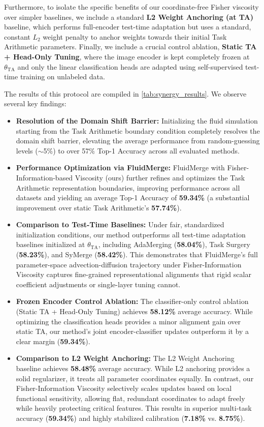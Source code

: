Furthermore, to isolate the specific benefits of our coordinate-free Fisher viscosity over simpler baselines, we include a standard \textbf{L2 Weight Anchoring (at TA)} baseline, which performs full-encoder test-time adaptation but uses a standard, constant $L_2$ weight penalty to anchor weights towards their initial Task Arithmetic parameters. Finally, we include a crucial control ablation, \textbf{Static TA + Head-Only Tuning}, where the image encoder is kept completely frozen at $\theta_{\text{TA}}$ and only the linear classification heads are adapted using self-supervised test-time training on unlabeled data.

The results of this protocol are compiled in \cref{tab:synergy_results}. We observe several key findings:
\begin{itemize}
    \item \textbf{Resolution of the Domain Shift Barrier:} Initializing the fluid simulation starting from the Task Arithmetic boundary condition completely resolves the domain shift barrier, elevating the average performance from random-guessing levels ($\sim$5\%) to over 57\% Top-1 Accuracy across all evaluated methods.
    \item \textbf{Performance Optimization via FluidMerge:} FluidMerge with Fisher-Information-based Viscosity (ours) further refines and optimizes the Task Arithmetic representation boundaries, improving performance across all datasets and yielding an average Top-1 Accuracy of \textbf{59.34\%} (a substantial improvement over static Task Arithmetic's \textbf{57.74\%}).
    \item \textbf{Comparison to Test-Time Baselines:} Under fair, standardized initialization conditions, our method outperforms all test-time adaptation baselines initialized at $\theta_{\text{TA}}$, including AdaMerging (\textbf{58.04\%}), Task Surgery (\textbf{58.23\%}), and SyMerge (\textbf{58.42\%}). This demonstrates that FluidMerge's full parameter-space advection-diffusion trajectory under Fisher-Information Viscosity captures fine-grained representational alignments that rigid scalar coefficient adjustments or single-layer tuning cannot.
    \item \textbf{Frozen Encoder Control Ablation:} The classifier-only control ablation (Static TA + Head-Only Tuning) achieves \textbf{58.12\%} average accuracy. While optimizing the classification heads provides a minor alignment gain over static TA, our method's joint encoder-classifier updates outperform it by a clear margin (\textbf{59.34\%}).
    \item \textbf{Comparison to L2 Weight Anchoring:} The L2 Weight Anchoring baseline achieves \textbf{58.48\%} average accuracy. While L2 anchoring provides a solid regularizer, it treats all parameter coordinates equally. In contrast, our Fisher-Information Viscosity selectively scales updates based on local functional sensitivity, allowing flat, redundant coordinates to adapt freely while heavily protecting critical features. This results in superior multi-task accuracy (\textbf{59.34\%}) and highly stabilized calibration (\textbf{7.18\%} vs. \textbf{8.75\%}).

\end{itemize}
